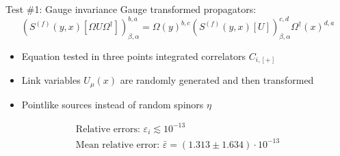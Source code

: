 \documentclass{beamer}
\begin{document}
\begin{frame}{Test \#1: Gauge invariance}
      Gauge transformed propagators:\newline
      \begin{equation*}
            \left(S^{(f)}(y, x)[\Omega U \Omega^\dagger]\right)^{b,a}_{\beta,\alpha} = \Omega (y)^{b,c} \left(S^{(f)}(y,x)[U]\right)^{c,d}_{\beta,\alpha} \Omega^\dagger (x)^{d,a}
      \end{equation*}
      \begin{itemize}
            \item Equation tested in three points integrated correlators $C_{i,[+]}$
            \item Link variables $U_\mu (x)$ are randomly generated and then transformed
            \item Pointlike sources instead of random spinors $\eta$
      \end{itemize}
      \begin{equation*}
            \begin{gathered}
                  \text{Relative errors: } \varepsilon_i \lesssim 10^{-13} \\
                  \text{Mean relative error: } \bar \varepsilon = (1.313 \pm 1.634) \cdot 10^{-13}
            \end{gathered}
      \end{equation*}
\end{frame}
\end{document}

